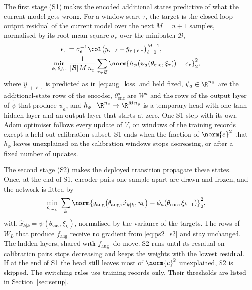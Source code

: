 The first stage (S1) makes the encoded additional states predictive of what
the current model gets wrong.
For a window start $\tau$, the target is the closed-loop output residual of
the current model over the next $M=n+1$ samples, normalised by its root mean
square $\sigma_e$ over the minibatch $\mathcal B$,
\begin{equation}
\begin{aligned}
 e_\tau&=\sigma_e^{-1}\col\bigl(y_{\tau+\ell}-\hat y_{\tau+\ell|\tau}\bigr)_{\ell=0}^{M-1},\\
 \min_{\phi,\,\theta_{\mathrm{enc}}^{a}}&\;
 \frac{1}{|\mathcal B|\,M\,n_y}\sum_{\tau\in\mathcal B}
 \norm{h_\phi\bigl(\psi_a(\theta_{\mathrm{enc}},\xi_\tau)\bigr)-e_\tau}_2^2,
\end{aligned}
\label{eq:ps2_s1}
\end{equation}
where $\hat y_{\tau+\ell|\tau}$ is predicted as in \eqref{eq:aug_loss} and
held fixed, $\psi_a\in\R^{n_{\bar x}}$ are the additional-state rows of the
encoder, $\theta_{\mathrm{enc}}^{a}$ are $W^a$ and the rows of the output
layer of $\tilde\psi$ that produce $\psi_a$, and
$h_\phi:\R^{n_{\bar x}}\to\R^{Mn_y}$ is a temporary head with one tanh hidden
layer and an output layer that starts at zero.
One S1 step with its own Adam optimiser follows every update of $V$, on
windows of the training records except a held-out calibration subset.
S1 ends when the fraction of $\norm{e}^2$ that $h_\phi$ leaves unexplained on
the calibration windows stops decreasing, or after a fixed number of updates.

The second stage (S2) makes the deployed transition propagate these states.
Once, at the end of S1, encoder pairs one sample apart are drawn and frozen,
and the network is fitted by
\begin{equation}
 \min_{\theta_{\mathrm{aug}}}\;
 \sum_{k}\norm{g_{\mathrm{aug}}\bigl(\theta_{\mathrm{aug}},\hat x_{k|k},u_k\bigr)
 -\psi_a(\theta_{\mathrm{enc}},\xi_{k+1})}_2^2,
 \label{eq:ps2_s2}
\end{equation}
with $\hat x_{k|k}=\psi(\theta_{\mathrm{enc}},\xi_k)$, normalised by the
variance of the targets.
The rows of $W_L$ that produce $f_{\mathrm{aug}}$ receive no gradient from
\eqref{eq:ps2_s2} and stay unchanged.
The hidden layers, shared with $f_{\mathrm{aug}}$, do move.
S2 runs until its residual on calibration pairs stops decreasing and keeps
the weights with the lowest residual.
If at the end of S1 the head still leaves most of $\norm{e}^2$ unexplained,
S2 is skipped.
The switching rules use training records only.
Their thresholds are listed in Section~\ref{sec:setup}.

